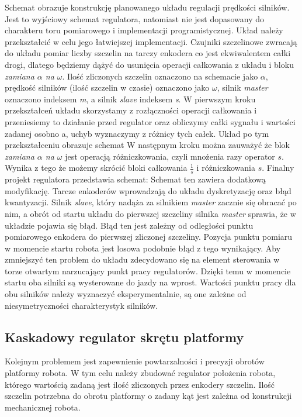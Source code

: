 \documentclass[11pt]{article}
\begin{document}
Schemat %
obrazuje konstrukcję planowanego układu regulacji prędkości silników.
Jest to wyjściowy schemat regulatora, natomiast nie jest dopasowany do charakteru toru pomiarowego i implementacji programistycznej.
Układ należy przekształcić w celu jego łatwiejszej implementacji.
Czujniki szczelinowe zwracają do układu pomiar liczby szczelin na tarczy enkodera co jest ekwiwalentem całki drogi, dlatego będziemy dążyć do usunięcia operacji całkowania z układu i bloku \textit{zamiana $ \alpha $ na $ \omega  $}.
Ilość zliczonych szczelin oznaczono na schemacie jako $ \alpha $, prędkość silników (ilość szczelin w czasie) oznaczono jako $ \omega $, silnik \textit{master} oznaczono indeksem \textit{m}, a silnik \textit{slave} indeksem \textit{s}.
W pierwszym kroku przekształceń układu skorzystamy z rozłączności operacji całkowania i przeniesiemy to działanie przed regulator oraz obliczymy całki sygnału i wartości zadanej osobno a, uchyb wyznaczymy z różnicy tych całek.
Układ po tym przekształceniu obrazuje schemat %
W następnym kroku można zauważyć że blok \textit{zamiana $ \alpha $ na $ \omega  $} jest operacją różniczkowania, czyli mnożenia razy operator $ s $. Wynika z tego że możemy skrócić bloki całkowania $ \frac{1}{s} $ i różniczkowania $ s $.
Finalny projekt regulatora przedstawia schemat: %
Schemat ten zawiera dodatkową modyfikację. Tarcze enkoderów wprowadzają do układu dyskretyzację oraz błąd kwantyzacji.
Silnik \textit{slave}, który nadąża za silnikiem \textit{master} zacznie się obracać po nim, a obrót od startu układu do pierwszej szczeliny silnika \textit{master} sprawia, że w układzie pojawia się błąd.
Błąd ten jest zależny od odległości punktu pomiarowego enkodera do pierwszej zliczonej szczeliny.
Pozycja punktu pomiaru w momencie startu robota jest losowa podobnie błąd z tego wynikający.
Aby zmniejszyć ten problem do układu zdecydowano się na element sterowania w torze otwartym narzucający punkt pracy regulatorów.
Dzięki temu w momencie startu oba silniki są wysterowane do jazdy na wprost.
Wartości punktu pracy dla obu silników należy wyznaczyć eksperymentalnie, są one zależne od niesymetryczności charakterystyk silników.


\subsection{Kaskadowy regulator skrętu platformy} \label{sec:reg_casc}
Kolejnym problemem jest zapewnienie powtarzalności i precyzji obrotów platformy robota.
W tym celu należy zbudować regulator położenia robota, którego wartością zadaną jest ilość zliczonych przez enkodery szczelin.
Ilość szczelin potrzebna do obrotu platformy o zadany kąt jest zależna od konstrukcji mechanicznej robota.
\end{document}
